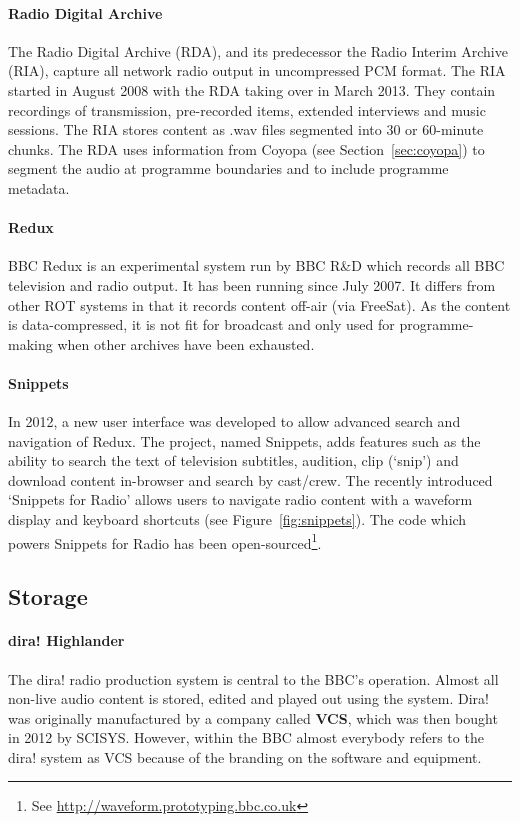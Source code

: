 \paragraph{Radio Digital Archive}
The Radio Digital Archive (RDA), and its predecessor the Radio Interim Archive
(RIA), capture all network radio output in uncompressed PCM format. The RIA
started in August 2008 with the RDA taking over in March 2013. They contain
recordings of transmission, pre-recorded items, extended interviews and music
sessions. The RIA stores content as .wav files segmented into 30 or 60-minute
chunks. The RDA uses information from Coyopa (see Section~\ref{sec:coyopa})  to
segment the audio at programme boundaries and to include programme metadata.

\paragraph{Redux}
BBC Redux is an experimental system run by BBC R\&D which records all BBC
television and radio output. It has been running since July 2007. It differs
from other ROT systems in that it records content off-air (via FreeSat). As the
content is data-compressed, it is not fit for broadcast and only used for
programme-making when other archives have been exhausted.

\paragraph{Snippets}
In 2012, a new user interface was developed to allow advanced search and
navigation of Redux. The project, named Snippets, adds features such as the
ability to search the text of television subtitles, audition, clip (`snip') and
download content in-browser and search by cast/crew. The recently introduced
`Snippets for Radio' allows users to navigate radio content with a waveform
display and keyboard shortcuts (see Figure~\ref{fig:snippets}). The code which
powers Snippets for Radio has been open-sourced\footnote{See
  \url{http://waveform.prototyping.bbc.co.uk}}.

\subsection{Storage}

\paragraph{dira! Highlander}
The dira! radio production system is central to the BBC's operation. Almost all
non-live audio content is stored, edited and played out using the system. Dira!
was originally manufactured by a company called \textbf{VCS}, which was then
bought in 2012 by SCISYS. However, within the BBC almost everybody refers to
the dira! system as VCS because of the branding on the software and equipment.

